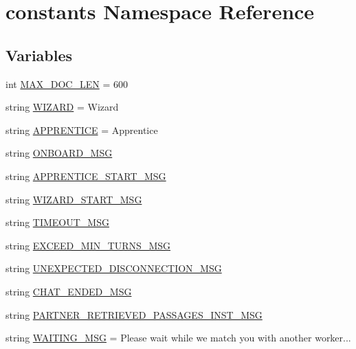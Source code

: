 \hypertarget{namespaceconstants}{}\section{constants Namespace Reference}
\label{namespaceconstants}
\subsection*{Variables}
\begin{DoxyCompactItemize}
\item 
int \hyperlink{namespaceconstants_a4494d33604200e3ae4309fa9a2cfee71}{M\+A\+X\+\_\+\+D\+O\+C\+\_\+\+L\+EN} = 600
\item 
string \hyperlink{namespaceconstants_ac1c110fe9f4ea6ca2603d3c131001c1e}{W\+I\+Z\+A\+RD} = \textquotesingle{}Wizard\textquotesingle{}
\item 
string \hyperlink{namespaceconstants_a9eeb0aa045e07c36ec81a10684aee2e0}{A\+P\+P\+R\+E\+N\+T\+I\+CE} = \textquotesingle{}Apprentice\textquotesingle{}
\item 
string \hyperlink{namespaceconstants_aab8c94f84e04692e22d922a20c9e1e6f}{O\+N\+B\+O\+A\+R\+D\+\_\+\+M\+SG}
\item 
string \hyperlink{namespaceconstants_aad1b4fee717300129af05f9bc7edac13}{A\+P\+P\+R\+E\+N\+T\+I\+C\+E\+\_\+\+S\+T\+A\+R\+T\+\_\+\+M\+SG}
\item 
string \hyperlink{namespaceconstants_ab1d98a45649177ca56ea809e7625a270}{W\+I\+Z\+A\+R\+D\+\_\+\+S\+T\+A\+R\+T\+\_\+\+M\+SG}
\item 
string \hyperlink{namespaceconstants_a218f1c20e67f028c234e0ed0ec9538e3}{T\+I\+M\+E\+O\+U\+T\+\_\+\+M\+SG}
\item 
string \hyperlink{namespaceconstants_a9ee3ecc35ae57dc8ee097b5b5bea720b}{E\+X\+C\+E\+E\+D\+\_\+\+M\+I\+N\+\_\+\+T\+U\+R\+N\+S\+\_\+\+M\+SG}
\item 
string \hyperlink{namespaceconstants_a77533e8b7d96673c5ae41ff7d44474c1}{U\+N\+E\+X\+P\+E\+C\+T\+E\+D\+\_\+\+D\+I\+S\+C\+O\+N\+N\+E\+C\+T\+I\+O\+N\+\_\+\+M\+SG}
\item 
string \hyperlink{namespaceconstants_acc9fee360f420b9cba2c54a8314f8b16}{C\+H\+A\+T\+\_\+\+E\+N\+D\+E\+D\+\_\+\+M\+SG}
\item 
string \hyperlink{namespaceconstants_a09ce3b3e085c08c15238232f9d6197e7}{P\+A\+R\+T\+N\+E\+R\+\_\+\+R\+E\+T\+R\+I\+E\+V\+E\+D\+\_\+\+P\+A\+S\+S\+A\+G\+E\+S\+\_\+\+I\+N\+S\+T\+\_\+\+M\+SG}
\item 
string \hyperlink{namespaceconstants_a8dd35a78500be9457e88ca9bb3becffe}{W\+A\+I\+T\+I\+N\+G\+\_\+\+M\+SG} = \textquotesingle{}Please wait while we match you with another worker...\textquotesingle{}

\end{DoxyCompactItemize}
